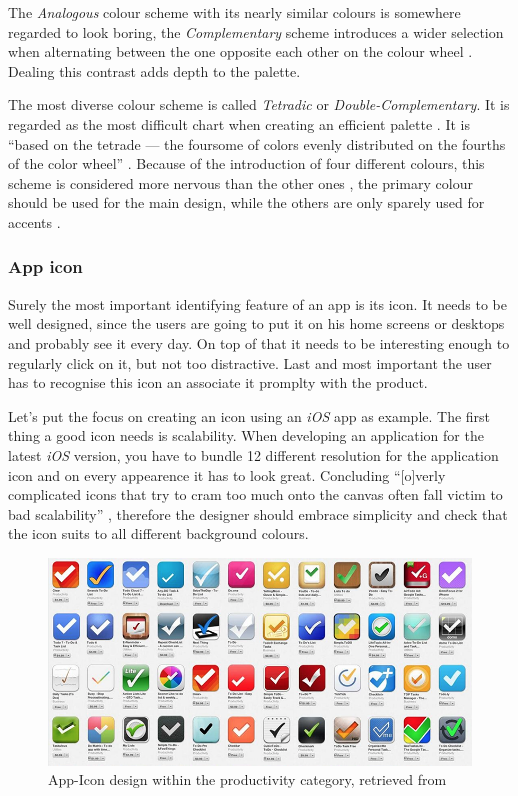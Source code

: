 The \emph{Analogous} colour scheme with its nearly similar colours is somewhere regarded to look boring, the \emph{Complementary} scheme introduces a wider selection when alternating between the one opposite each other on the colour wheel \cite{Chapman:2010ab}. Dealing this contrast adds depth to the palette.

The most diverse colour scheme is called \emph{Tetradic} or \emph{Double-Complementary}. It is regarded as the most difficult chart when creating an efficient palette \cite{Chapman:2010ab}. It is \enquote{based on the tetrade — the foursome of colors evenly distributed on the fourths of the color wheel} \cite{Stanicek:2011aa}. Because of the introduction of four different colours, this scheme is considered more nervous than the other ones \cite{Stanicek:2011aa}, the primary colour should be used for the main design, while the others are only sparely used for accents \cite{Chapman:2010ab}.

\subsubsection{App icon}
\label{sec:Icon}
Surely the most important identifying feature of an app is its icon. It needs to be well designed, since the users are going to put it on his home screens or desktops and probably see it every day. On top of that it needs to be interesting enough to regularly click on it, but not too distractive. Last and most important the user has to recognise this icon an associate it promplty with the product. \cite{Flarup:2015aa}

Let's put the focus on creating an icon using an \emph{iOS} app as example. The first thing a good icon needs is scalability. When developing an application for the latest \emph{iOS} version, you have to bundle 12 different resolution for the application icon and on every appearence it has to look great. Concluding \enquote{[o]verly complicated icons that try to cram too much onto the canvas often fall victim to bad scalability} \cite{Flarup:2015aa}, therefore the designer should embrace simplicity and check that the icon suits to all different background colours. \cite{Flarup:2015aa}

\begin{figure}[h]
  	\centering
  	\includegraphics[width=0.7\linewidth]{./images/productivity-icons.png}
  	\caption{App-Icon design within the productivity category, retrieved from \cite{Flarup:2015aa}}
	\label{fig:AppProd}
\end{figure}
\nocite{Flarup:2015aa}

